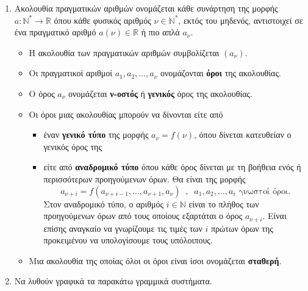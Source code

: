 \documentclass[11pt]{article}
\begin{document}
\begin{enumerate}


\item
Ακολουθία πραγματικών αριθμών ονομάζεται κάθε συνάρτηση της μορφής $ a:\mathbb{N}^*\rightarrow\mathbb{R} $ όπου κάθε φυσικός αριθμός $ \nu\in\mathbb{N}^* $, εκτός του μηδενός, αντιστοιχεί σε ένα πραγματικό αριθμό $ a(\nu)\in\mathbb{R} $ ή πιο απλά $ a_\nu $.
\begin{itemize}[itemsep=0mm]
\item Η ακολουθία των πραγματικών αριθμών συμβολίζεται $ \left( a_\nu\right)  $.
\item Οι πραγματικοί αριθμοί $ a_1, a_2,\ldots,a_\nu $ ονομάζονται \textbf{όροι} της ακολουθίας.
\item Ο όρος $ a_\nu $ ονομάζεται \textbf{ν-οστός} ή \textbf{γενικός} όρος της ακολουθίας.
\item Οι όροι μιας ακολουθίας μπορούν να δίνονται είτε από 
\begin{itemize}[itemsep=0mm]
\item έναν \textbf{γενικό τύπο} της μορφής $ a_\nu=f(\nu) $, όπου δίνεται κατευθείαν ο γενικός όρος της
\item είτε από \textbf{αναδρομικό τύπο} όπου κάθε όρος δίνεται με τη βοήθεια ενός ή περισσότερων προηγούμενων όρων. Θα είναι της μορφής \[ a_{\nu+i}=f(a_{\nu+i-1},\ldots,a_{\nu+1},a_\nu)\;\;,\;\;a_1,a_2,\ldots,a_i\textrm{ γνωστοί όροι.} \] Στον αναδρομικό τύπο, ο αριθμός $ i\in\mathbb{N} $ είναι το πλήθος των προηγούμενων όρων από τους οποίους εξαρτάται ο όρος $ a_{\nu+i} $. Είναι επίσης αναγκαίο να γνωρίζουμε τις τιμές των $ i $ πρώτων όρων της προκειμένου να υπολογίσουμε τους υπόλοιπους.
\end{itemize}
\item Μια ακολουθία της οποίας όλοι οι όροι είναι ίσοι ονομάζεται \textbf{σταθερή}.
\end{itemize}



\item
Να λυθούν γραφικά τα παρακάτω γραμμικά συστήματα.
\begin{multicols}{2}
\end{multicols}




\end{enumerate}
\end{document}
